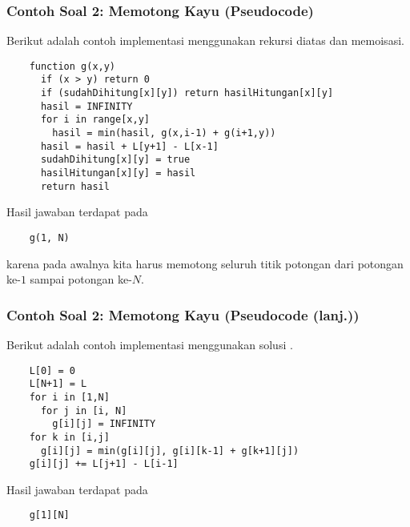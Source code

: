 \begin{frame} [fragile]
\frametitle{Contoh Soal 2: Memotong Kayu (Pseudocode)}
  Berikut adalah contoh implementasi menggunakan rekursi diatas dan memoisasi.
  \begin{lstlisting}
    function g(x,y)
      if (x > y) return 0
      if (sudahDihitung[x][y]) return hasilHitungan[x][y]
      hasil = INFINITY
      for i in range[x,y]
        hasil = min(hasil, g(x,i-1) + g(i+1,y))
      hasil = hasil + L[y+1] - L[x-1]
      sudahDihitung[x][y] = true
      hasilHitungan[x][y] = hasil
      return hasil
  \end{lstlisting}
  Hasil jawaban terdapat pada 
  \begin{lstlisting}
    g(1, N)
  \end{lstlisting}
  karena pada awalnya kita harus memotong seluruh titik potongan dari potongan ke-$1$ sampai potongan ke-$N$.
\end{frame}

\begin{frame} [fragile]
\frametitle{Contoh Soal 2: Memotong Kayu (Pseudocode (lanj.))}
  Berikut adalah contoh implementasi menggunakan solusi .
  \begin{lstlisting}
    L[0] = 0
    L[N+1] = L
    for i in [1,N]
      for j in [i, N]
        g[i][j] = INFINITY
	for k in [i,j]
	  g[i][j] = min(g[i][j], g[i][k-1] + g[k+1][j])
	g[i][j] += L[j+1] - L[i-1]
  \end{lstlisting}
  Hasil jawaban terdapat pada
  \begin{lstlisting}
    g[1][N]
  \end{lstlisting}
\end{frame}

